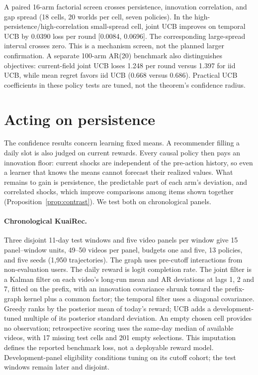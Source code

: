 \documentclass[sigconf,review,anonymous]{acmart}
\begin{document}
A paired 16-arm factorial screen crosses persistence, innovation correlation, and gap spread (18 cells, 20 worlds per cell, seven policies). In the high-persistence/high-correlation small-spread cell, joint UCB improves on temporal UCB by 0.0390 loss per round [0.0084, 0.0696]. The corresponding large-spread interval crosses zero. This is a mechanism screen, not the planned larger confirmation. A separate 100-arm AR(20) benchmark also distinguishes objectives: current-field joint UCB loses 1.248 per round versus 1.397 for iid UCB, while mean regret favors iid UCB (0.668 versus 0.686). Practical UCB coefficients in these policy tests are tuned, not the theorem's confidence radius.

\section{Acting on persistence}\label{sec:fluct}

The confidence results concern learning fixed means. A recommender filling a daily slot is also judged on current rewards. Every causal policy then pays an innovation floor: current shocks are independent of the pre-action history, so even a learner that knows the means cannot forecast their realized values. What remains to gain is persistence, the predictable part of each arm's deviation, and correlated shocks, which improve comparisons among items shown together (Proposition~\ref{prop:contrast}). We test both on chronological panels.

\paragraph{Chronological KuaiRec.} Three disjoint 11-day test windows and five video panels per window give 15 panel--window units, 49--50 videos per panel, budgets one and five, 13 policies, and five seeds (1,950 trajectories). The graph uses pre-cutoff interactions from non-evaluation users. The daily reward is logit completion rate. The joint filter is a Kalman filter on each video's long-run mean and AR deviations at lags 1, 2 and 7, fitted on the prefix, with an innovation covariance shrunk toward the prefix-graph kernel plus a common factor; the temporal filter uses a diagonal covariance. Greedy ranks by the posterior mean of today's reward; UCB adds a development-tuned multiple of its posterior standard deviation. An empty chosen cell provides no observation; retrospective scoring uses the same-day median of available videos, with 17 missing test cells and 201 empty selections. This imputation defines the reported benchmark loss, not a deployable reward model. Development-panel eligibility conditions tuning on its cutoff cohort; the test windows remain later and disjoint.
\end{document}
